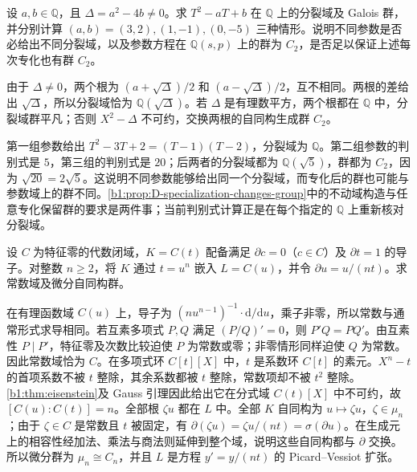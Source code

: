 \begin{exercise}\label{b1:ex:D-variable-base}
	设 \(a,b\in\mathbb Q\)，且 \(\Delta=a^2-4b\ne0\)。求 \(T^2-aT+b\) 在 \(\mathbb Q\) 上的分裂域及 Galois 群，并分别计算 \((a,b)=(3,2),(1,-1),(0,-5)\) 三种情形。说明不同参数是否必给出不同分裂域，以及参数方程在 \(\mathbb Q(s,p)\) 上的群为 \(C_2\)，是否足以保证上述每次专化也有群 \(C_2\)。
\end{exercise}

\begin{solution}
	由于 \(\Delta\ne0\)，两个根为 \((a+\sqrt\Delta)/2\) 和 \((a-\sqrt\Delta)/2\)，互不相同。两根的差给出 \(\sqrt\Delta\)，所以分裂域恰为 \(\mathbb Q(\sqrt\Delta)\)。若 \(\Delta\) 是有理数平方，两个根都在 \(\mathbb Q\) 中，分裂域群平凡；否则 \(X^2-\Delta\) 不可约，交换两根的自同构生成群 \(C_2\)。

	第一组参数给出 \(T^2-3T+2=(T-1)(T-2)\)，分裂域为 \(\mathbb Q\)。第二组参数的判别式是 \(5\)，第三组的判别式是 \(20\)；后两者的分裂域都为 \(\mathbb Q(\sqrt5)\)，群都为 \(C_2\)，因为 \(\sqrt{20}=2\sqrt5\)。这说明不同参数能够给出同一个分裂域，而专化后的群也可能与参数域上的群不同。\cref{b1:prop:D-specialization-changes-group}中的不动域构造与任意专化保留群的要求是两件事；当前判别式计算正是在每个指定的 \(\mathbb Q\) 上重新核对分裂域。
\end{solution}

\begin{exercise}\label{b1:ex:D-differential-power}
	设 \(C\) 为特征零的代数闭域，\(K=C(t)\) 配备满足 \(\partial c=0\)（\(c\in C\)）及 \(\partial t=1\) 的导子。对整数 \(n\geq2\)，将 \(K\) 通过 \(t=u^n\) 嵌入 \(L=C(u)\)，并令 \(\partial u=u/(nt)\)。求常数域及微分自同构群。
\end{exercise}

\begin{solution}
	在有理函数域 \(C(u)\) 上，导子为 \((nu^{n-1})^{-1}\cdot\mathrm{d}/\mathrm{d}u\)，乘子非零，所以常数与通常形式求导相同。若互素多项式 \(P,Q\) 满足 \((P/Q)'=0\)，则 \(P'Q=PQ'\)。由互素性 \(P\mid P'\)，特征零及次数比较迫使 \(P\) 为常数或零；非零情形同样迫使 \(Q\) 为常数。因此常数域恰为 \(C\)。在多项式环 \(C[t][X]\) 中，\(t\) 是系数环 \(C[t]\) 的素元。\(X^n-t\) 的首项系数不被 \(t\) 整除，其余系数都被 \(t\) 整除，常数项却不被 \(t^2\) 整除。\cref{b1:thm:eisenstein}及 Gauss 引理因此给出它在分式域 \(C(t)[X]\) 中不可约，故 \([C(u):C(t)]=n\)。全部根 \(\zeta u\) 都在 \(L\) 中。全部 \(K\) 自同构为 \(u\mapsto\zeta u\)，\(\zeta\in\mu_n\)；由于 \(\zeta\in C\) 是常数且 \(t\) 被固定，有 \(\partial(\zeta u)=\zeta u/(nt)=\sigma(\partial u)\)。在生成元上的相容性经加法、乘法与商法则延伸到整个域，说明这些自同构都与 \(\partial\) 交换。所以微分群为 \(\mu_n\cong C_n\)，并且 \(L\) 是方程 \(y'=y/(nt)\) 的 Picard--Vessiot 扩张。
\end{solution}

